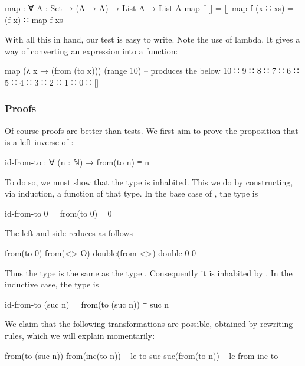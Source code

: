 \begin{colored}[elm]
map : ∀ {A : Set} → (A → A) → List A → List A
map f [] = []
map f (x ∷ xs) = (f x) ∷ map f xs
\end{colored}

With all this in hand, our test is easy to write.  Note the use of lambda.  It gives a way of converting an expression into a function:

\begin{colored}[elm]
map (λ x → (from (to x))) (range 10)
-- produces the below
10 ∷ 9 ∷ 8 ∷ 7 ∷ 6 ∷ 5 ∷ 4 ∷ 3 ∷ 2 ∷ 1 ∷ 0 ∷ []
\end{colored}

\subsubsection{Proofs}

Of course proofs are better than tests.  We first aim to prove the proposition that  is a left inverse of :

\begin{colored}[elm]
id-from-to : ∀ (n : ℕ) → from(to n) ≡ n
\end{colored}

To do so, we must show that the type  is inhabited.  This we do by constructing, via induction, a function of that type.  In the base case of , the type is

\begin{colored}[elm]
id-from-to 0 = from(to 0) ≡ 0
\end{colored}

The left-and side reduces as follows

\begin{colored}[elm]
from(to 0)
from(<> O)
double(from <>)
double 0
0
\end{colored}

Thus the type  is the same as the type .  Consequently it is inhabited by . In the inductive case, the type is

\begin{colored}[elm]
id-from-to (suc n) = from(to (suc n)) ≡ suc n
\end{colored}

We claim that the following transformations are possible, obtained by rewriting rules, which we will explain momentarily:

\begin{colored}[elm]
from(to (suc n))
from(inc(to n))  -- le-to-suc
suc(from(to n))  -- le-from-inc-to
\end{colored}

